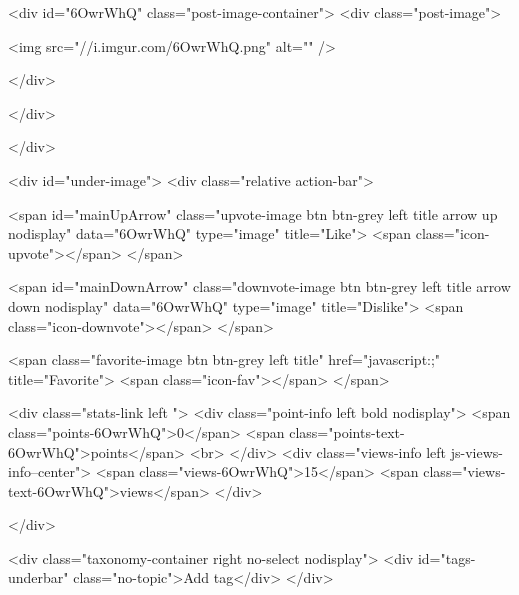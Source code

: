                     

                    <div id="6OwrWhQ" class="post-image-container">
                        <div class="post-image">
    

                        <img src="//i.imgur.com/6OwrWhQ.png" alt="" />
        
    
</div>


                        
                    </div>
                

                

                
                </div>

                <div id="under-image">
                    <div class="relative action-bar">

    <span id="mainUpArrow" class="upvote-image btn btn-grey left title arrow up nodisplay" data="6OwrWhQ" type="image" title="Like">
        <span class="icon-upvote"></span>
    </span>

    <span id="mainDownArrow" class="downvote-image btn btn-grey left title arrow down nodisplay" data="6OwrWhQ" type="image" title="Dislike">
        <span class="icon-downvote"></span>
    </span>

    <span class="favorite-image btn btn-grey left title" href="javascript:;" title="Favorite">
        <span class="icon-fav"></span>
    </span>

    <div class="stats-link left ">
                    <div class="point-info left bold nodisplay">
                <span class="points-6OwrWhQ">0</span>
                <span class="points-text-6OwrWhQ">points</span>
                <br>
            </div>
            <div class="views-info left js-views-info--center">
                <span class="views-6OwrWhQ">15</span>
                <span class="views-text-6OwrWhQ">views</span>
            </div>
        

        
                    
        

    </div>

    <div class="taxonomy-container right no-select nodisplay">
        <div id="tags-underbar" class="no-topic">Add tag</div>
    </div>

